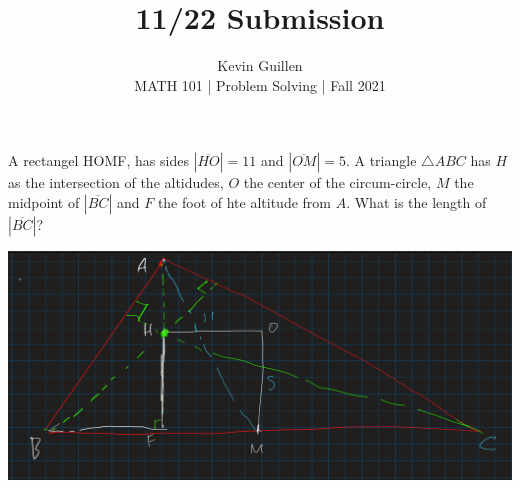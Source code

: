 \documentclass[11pt]{article}
\newenvironment{problem}[2][Problem\!]{\begin{trivlist}
\item[\hskip \labelsep {\bfseries #1}\hskip \labelsep {\bfseries #2}]}{\end{trivlist}}
\newcommand{\abs}[1]{\left\lvert#1\right\rvert} %
\begin{document}
 
\title{11/22 Submission}
\author{Kevin Guillen\\[0.5em]
MATH 101 | Problem Solving | Fall 2021}
\date{} 

\maketitle

\begin{tcolorbox}
  \begin{problem} {IC | 11/15 | 148. (Putnam)} 
    A rectangel HOMF, has sides $\abs{\overline{HO}} = 11$ and $\abs{\overline{OM}} = 5$. A triangle $\triangle ABC$ has $H$ as the intersection of the altidudes, $O$ the center of the circum-circle, $M$ the midpoint of $\abs{\overline{BC}}$ and $F$ the foot of hte altitude from $A$. What is the length of $\abs{\overline{BC}}$?
  \end{problem}
\end{tcolorbox}
\includegraphics[scale=.5]{prob1}
\end{document}
